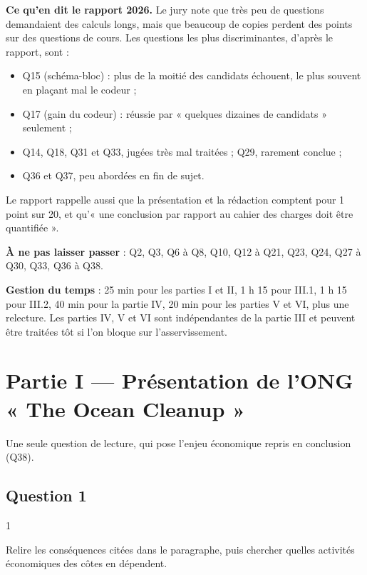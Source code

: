 \documentclass[11pt,a4paper]{article}
\providecommand{\tightlist}{\setlength{\itemsep}{0pt}\setlength{\parskip}{0pt}}
\begin{document}
\textbf{Ce qu'en dit le rapport 2026.} Le jury note que très peu de questions demandaient des calculs longs, mais que beaucoup de copies perdent des points sur des questions de cours. Les questions les plus discriminantes, d'après le rapport, sont :

\begin{itemize}
\tightlist
\item
  Q15 (schéma-bloc) : plus de la moitié des candidats échouent, le plus souvent en plaçant mal le codeur ;
\item
  Q17 (gain du codeur) : réussie par « quelques dizaines de candidats » seulement ;
\item
  Q14, Q18, Q31 et Q33, jugées très mal traitées ; Q29, rarement conclue ;
\item
  Q36 et Q37, peu abordées en fin de sujet.
\end{itemize}

Le rapport rappelle aussi que la présentation et la rédaction comptent pour 1 point sur 20, et qu'« une conclusion par rapport au cahier des charges doit être quantifiée ».

\textbf{À ne pas laisser passer} : Q2, Q3, Q6 à Q8, Q10, Q12 à Q21, Q23, Q24, Q27 à Q30, Q33, Q36 à Q38.

\textbf{Gestion du temps} : 25 min pour les parties I et II, 1 h 15 pour III.1, 1 h 15 pour III.2, 40 min pour la partie IV, 20 min pour les parties V et VI, plus une relecture. Les parties IV, V et VI sont indépendantes de la partie III et peuvent être traitées tôt si l'on bloque sur l'asservissement.

\hypertarget{partie-i-pruxe9sentation-de-long-the-ocean-cleanup}{%
\section{Partie I --- Présentation de l'ONG « The Ocean Cleanup »}\label{partie-i-pruxe9sentation-de-long-the-ocean-cleanup}}

Une seule question de lecture, qui pose l'enjeu économique repris en conclusion (Q38).

\hypertarget{question-1}{%
\subsection{Question 1}\label{question-1}}

\begin{indication}{1}

Relire les conséquences citées dans le paragraphe, puis chercher quelles activités économiques des côtes en dépendent.

\end{indication}
\end{document}
